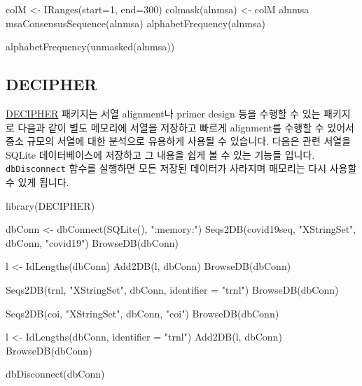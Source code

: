 \documentclass[
]{book}
\newenvironment{Shaded}{\begin{snugshade}}{\end{snugshade}}
\newcommand{\AttributeTok}[1]{\textcolor[rgb]{0.77,0.63,0.00}{#1}}
\newcommand{\DecValTok}[1]{\textcolor[rgb]{0.00,0.00,0.81}{#1}}
\newcommand{\FunctionTok}[1]{\textcolor[rgb]{0.00,0.00,0.00}{#1}}
\newcommand{\NormalTok}[1]{#1}
\newcommand{\OtherTok}[1]{\textcolor[rgb]{0.56,0.35,0.01}{#1}}
\newcommand{\StringTok}[1]{\textcolor[rgb]{0.31,0.60,0.02}{#1}}
\begin{document}
\begin{Shaded}
\begin{Highlighting}[]
\NormalTok{colM }\OtherTok{\textless{}{-}} \FunctionTok{IRanges}\NormalTok{(}\AttributeTok{start=}\DecValTok{1}\NormalTok{, }\AttributeTok{end=}\DecValTok{300}\NormalTok{)}
\FunctionTok{colmask}\NormalTok{(alnmsa) }\OtherTok{\textless{}{-}}\NormalTok{ colM}
\NormalTok{alnmsa}
\FunctionTok{msaConsensusSequence}\NormalTok{(alnmsa)}
\FunctionTok{alphabetFrequency}\NormalTok{(alnmsa)}

\FunctionTok{alphabetFrequency}\NormalTok{(}\FunctionTok{unmasked}\NormalTok{(alnmsa))}
\end{Highlighting}
\end{Shaded}

\hypertarget{decipher}{%
\subsection{DECIPHER}\label{decipher}}

\href{https://www.bioconductor.org/packages/release/bioc/html/DECIPHER.html}{DECIPHER} 패키지는 서열 alignment나 primer design 등을 수행할 수 있는 패키지로 다음과 같이 별도 메모리에 서열을 저장하고 빠르게 alignment를 수행할 수 있어서 중소 규모의 서열에 대한 분석으로 유용하게 사용될 수 있습니다. 다음은 관련 서열을 SQLite 데이터베이스에 저장하고 그 내용을 쉽게 볼 수 있는 기능들 입니다. \texttt{dbDisconnect} 함수를 실행하면 모든 저장된 데이터가 사라지며 매모리는 다시 사용할 수 있게 됩니다.

\begin{Shaded}
\begin{Highlighting}[]
\FunctionTok{library}\NormalTok{(DECIPHER)}

\NormalTok{dbConn }\OtherTok{\textless{}{-}} \FunctionTok{dbConnect}\NormalTok{(}\FunctionTok{SQLite}\NormalTok{(), }\StringTok{":memory:"}\NormalTok{)}
\FunctionTok{Seqs2DB}\NormalTok{(covid19seq, }\StringTok{"XStringSet"}\NormalTok{, dbConn, }\StringTok{"covid19"}\NormalTok{)}
\FunctionTok{BrowseDB}\NormalTok{(dbConn)}

\NormalTok{l }\OtherTok{\textless{}{-}} \FunctionTok{IdLengths}\NormalTok{(dbConn)}
\FunctionTok{Add2DB}\NormalTok{(l, dbConn)}
\FunctionTok{BrowseDB}\NormalTok{(dbConn)}

\FunctionTok{Seqs2DB}\NormalTok{(trnl, }\StringTok{"XStringSet"}\NormalTok{, dbConn, }\AttributeTok{identifier =} \StringTok{"trnl"}\NormalTok{)}
\FunctionTok{BrowseDB}\NormalTok{(dbConn)}

\FunctionTok{Seqs2DB}\NormalTok{(coi, }\StringTok{"XStringSet"}\NormalTok{, dbConn, }\StringTok{"coi"}\NormalTok{)}
\FunctionTok{BrowseDB}\NormalTok{(dbConn)}

\NormalTok{l }\OtherTok{\textless{}{-}} \FunctionTok{IdLengths}\NormalTok{(dbConn, }\AttributeTok{identifier =} \StringTok{"trnl"}\NormalTok{)}
\FunctionTok{Add2DB}\NormalTok{(l, dbConn)}
\FunctionTok{BrowseDB}\NormalTok{(dbConn)}

\FunctionTok{dbDisconnect}\NormalTok{(dbConn)}
\end{Highlighting}
\end{Shaded}
\end{document}
